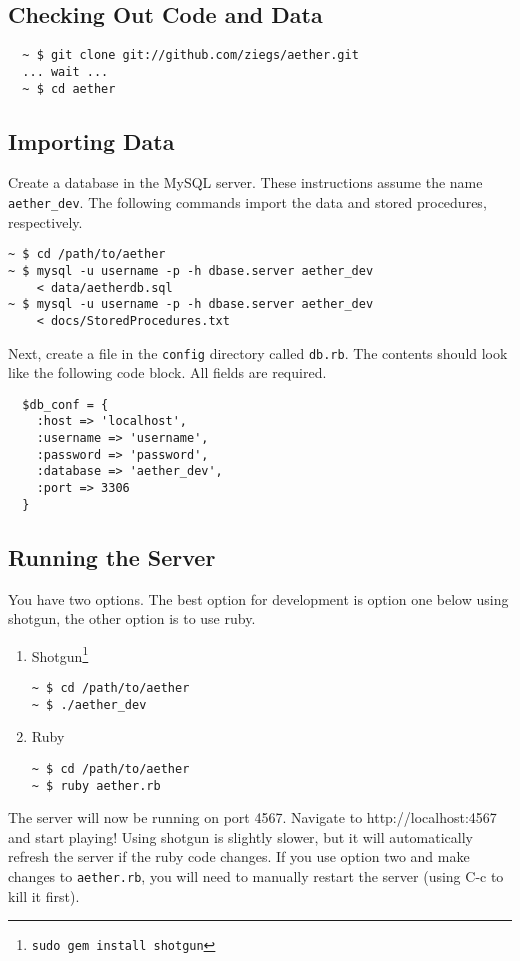 \documentclass[12pt, letterpaper]{article}
\begin{document}
\subsection{Checking Out Code and Data}
\begin{verbatim}
  ~ $ git clone git://github.com/ziegs/aether.git
  ... wait ...
  ~ $ cd aether
\end{verbatim}

\subsection{Importing Data}
Create a database in the MySQL server. These instructions assume the name \verb!aether_dev!. The following commands import the data and stored procedures, respectively.
\begin{verbatim}
~ $ cd /path/to/aether
~ $ mysql -u username -p -h dbase.server aether_dev 
    < data/aetherdb.sql
~ $ mysql -u username -p -h dbase.server aether_dev
    < docs/StoredProcedures.txt
\end{verbatim}
Next, create a file in the \verb!config! directory called \verb!db.rb!. The contents should look like the following code block. All fields are required.
\begin{verbatim}
  $db_conf = {
    :host => 'localhost',
    :username => 'username',
    :password => 'password',
    :database => 'aether_dev',
    :port => 3306
  }
\end{verbatim}

\subsection{Running the Server}
You have two options. The best option for development is option one below using shotgun, the other option is to use ruby.
\begin{enumerate}
  \item Shotgun\footnote{{\tt sudo gem install shotgun}}
  \begin{verbatim}
~ $ cd /path/to/aether
~ $ ./aether_dev
  \end{verbatim} 
  \item Ruby
  \begin{verbatim}
~ $ cd /path/to/aether
~ $ ruby aether.rb
  \end{verbatim}
\end{enumerate}
The server will now be running on port 4567. Navigate to http://localhost:4567 and start playing! Using shotgun is slightly slower, but it will automatically refresh the server if the ruby code changes. If you use option two and make changes to \verb!aether.rb!, you will need to manually restart the server (using C-c to kill it first).
\end{document}
